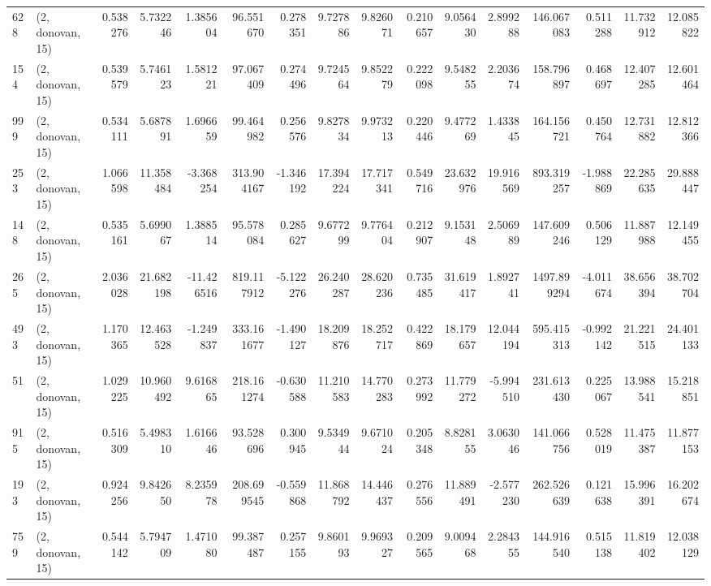 \begin{tabular}{llrrrrrrrrrrrrrr}
628  &  (2, donovan, 15) &   0.538276 &   5.732246 &   1.385604 &     96.551670 &    0.278351 &    9.727886 &    9.826071 &  0.210657 &   9.056430 &   2.899288 &   146.067083 &   0.511288 &  11.732912 &  12.085822 \\
154  &  (2, donovan, 15) &   0.539579 &   5.746123 &   1.581221 &     97.067409 &    0.274496 &    9.724564 &    9.852279 &  0.222098 &   9.548255 &   2.203674 &   158.796897 &   0.468697 &  12.407285 &  12.601464 \\
999  &  (2, donovan, 15) &   0.534111 &   5.687891 &   1.696659 &     99.464982 &    0.256576 &    9.827834 &    9.973213 &  0.220446 &   9.477269 &   1.433845 &   164.156721 &   0.450764 &  12.731882 &  12.812366 \\
253  &  (2, donovan, 15) &   1.066598 &  11.358484 &  -3.368254 &    313.904167 &   -1.346192 &   17.394224 &   17.717341 &  0.549716 &  23.632976 &  19.916569 &   893.319257 &  -1.988869 &  22.285635 &  29.888447 \\
148  &  (2, donovan, 15) &   0.535161 &   5.699067 &   1.388514 &     95.578084 &    0.285627 &    9.677299 &    9.776404 &  0.212907 &   9.153148 &   2.506989 &   147.609246 &   0.506129 &  11.887988 &  12.149455 \\
265  &  (2, donovan, 15) &   2.036028 &  21.682198 & -11.426516 &    819.117912 &   -5.122276 &   26.240287 &   28.620236 &  0.735485 &  31.619417 &   1.892741 &  1497.899294 &  -4.011674 &  38.656394 &  38.702704 \\
493  &  (2, donovan, 15) &   1.170365 &  12.463528 &  -1.249837 &    333.161677 &   -1.490127 &   18.209876 &   18.252717 &  0.422869 &  18.179657 &  12.044194 &   595.415313 &  -0.992142 &  21.221515 &  24.401133 \\
51   &  (2, donovan, 15) &   1.029225 &  10.960492 &   9.616865 &    218.161274 &   -0.630588 &   11.210583 &   14.770283 &  0.273992 &  11.779272 &  -5.994510 &   231.613430 &   0.225067 &  13.988541 &  15.218851 \\
915  &  (2, donovan, 15) &   0.516309 &   5.498310 &   1.616646 &     93.528696 &    0.300945 &    9.534944 &    9.671024 &  0.205348 &   8.828155 &   3.063046 &   141.066756 &   0.528019 &  11.475387 &  11.877153 \\
193  &  (2, donovan, 15) &   0.924256 &   9.842650 &   8.235978 &    208.699545 &   -0.559868 &   11.868792 &   14.446437 &  0.276556 &  11.889491 &  -2.577230 &   262.526639 &   0.121638 &  15.996391 &  16.202674 \\
759  &  (2, donovan, 15) &   0.544142 &   5.794709 &   1.471080 &     99.387487 &    0.257155 &    9.860193 &    9.969327 &  0.209565 &   9.009468 &   2.284355 &   144.916540 &   0.515138 &  11.819402 &  12.038129 \\

\end{tabular}
